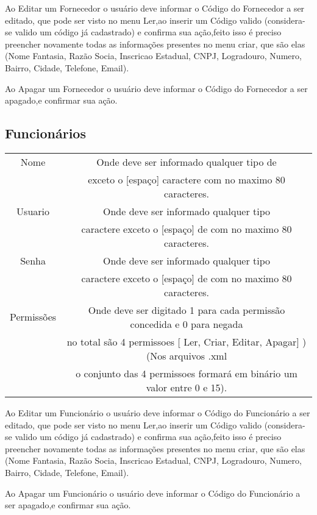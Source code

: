 \documentclass[titlepage]{article}
\begin{document}
				Ao Editar um Fornecedor o usuário deve informar o Código do Fornecedor a ser editado, que pode ser visto no menu Ler,ao inserir um Código valido (considera-se valido um código já cadastrado) e confirma sua ação,feito isso é preciso preencher novamente todas as informações presentes no menu criar, que são elas (Nome Fantasia, Razão Socia, Inscricao Estadual, CNPJ, Logradouro, Numero, Bairro, Cidade, Telefone, Email).

				Ao Apagar um Fornecedor o usuário deve informar o Código do Fornecedor a ser apagado,e confirmar sua ação. 

				\newpage
				\subsection{Funcionários}
				\begin{table}[h]%
					\begin{tabular}{|c|c|}
					\hline
					Nome  & Onde deve ser informado qualquer tipo de \\& exceto o [espaço] caractere com no maximo 80 caracteres.\\
					\hline
					Usuario  & Onde deve ser informado qualquer tipo \\& caractere exceto o [espaço] de com no maximo 80 caracteres.\\
					\hline
					Senha  & Onde deve ser informado qualquer tipo \\& caractere exceto o [espaço] de com no maximo 80 caracteres.\\
					\hline
					Permissões &  					Onde deve ser digitado 1 para cada permissão concedida e 0 para  negada\\& 					no total são 4 permissoes [ Ler, Criar, Editar, Apagar] )(Nos arquivos .xml\\& 					 o conjunto das 4 permissoes formará em binário um valor entre 0 e 15).\\ 					
					\hline
					\end{tabular}
				\end{table}

				Ao Editar um Funcionário o usuário deve informar o Código do Funcionário a ser editado, que pode ser visto no menu Ler,ao inserir um Código valido (considera-se valido um código já cadastrado) e confirma sua ação,feito isso é preciso preencher novamente todas as informações presentes no menu criar, que são elas (Nome Fantasia, Razão Socia, Inscricao Estadual, CNPJ, Logradouro, Numero, Bairro, Cidade, Telefone, Email).

				Ao Apagar um Funcionário o usuário deve informar o Código do Funcionário a ser apagado,e confirmar sua ação. 


	
\end{document}
